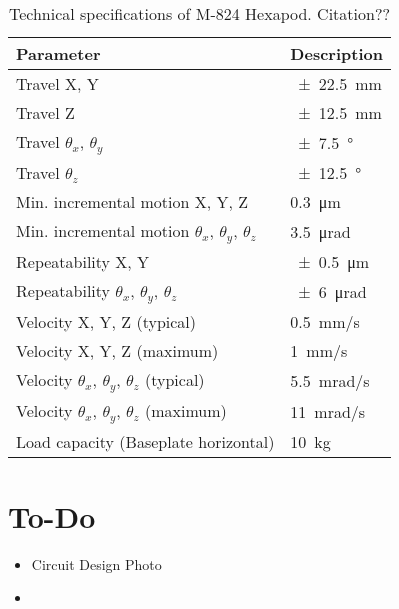 \begin{table}[h]
    \centering
    \footnotesize
    \renewcommand{\arraystretch}{1.2}
    \begin{tabular}{p{7cm}p{3cm}}
        \toprule
        \textbf{Parameter} & \textbf{Description} \\
        \midrule
        Travel X, Y & \SI{\pm22.5}{\milli\meter} \\        
        Travel Z & \SI{\pm12.5}{\milli\meter} \\        
        Travel $\theta_x$, $\theta_y$ & \SI{\pm7.5}{\degree} \\        
        Travel $\theta_z$ & \SI{\pm12.5}{\degree} \\        
        Min. incremental motion X, Y, Z & \SI{0.3}{\micro\meter} \\
        Min. incremental motion $\theta_x$, $\theta_y$, $\theta_z$ & \SI{3.5}{\micro\radian} \\
        Repeatability X, Y & \SI{\pm0.5}{\micro\meter} \\
        Repeatability $\theta_x$, $\theta_y$, $\theta_z$ & \SI{\pm6}{\micro\radian} \\
        Velocity X, Y, Z (typical) & \SI{0.5}{\milli\meter/\second} \\
        Velocity X, Y, Z (maximum) & \SI{1}{\milli\meter/\second} \\
        Velocity $\theta_x$, $\theta_y$, $\theta_z$ (typical) & \SI{5.5}{\milli\radian/\second} \\
        Velocity $\theta_x$, $\theta_y$, $\theta_z$ (maximum) & \SI{11}{\milli\radian/\second} \\
        Load capacity (Baseplate horizontal) & \SI{10}{\kilo\gram} \\
        \bottomrule
    \end{tabular}
    \caption{Technical specifications of M-824 Hexapod. Citation??}
    \label{table:technical_specifications_hexapod}
\end{table}

\clearpage

\section*{To-Do}
\begin{itemize}

    \item Circuit Design Photo
    \item 

\end{itemize}